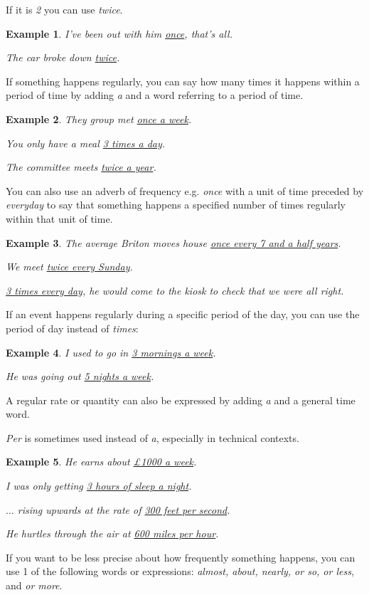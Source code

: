 \documentclass[oneside]{book}
\numberwithin{equation}{section}
\newtheorem{example}{Example}[section]
\begin{document}
If it is \textit{2} you can use \textit{twice}.
\begin{example}
    I've been out with him \underline{once}, that's all.
    
    The car broke down \underline{twice}.
\end{example}
If something happens regularly, you can say how many times it happens within a period of time by adding \textit{a} and a word referring to a period of time.
\begin{example}
    They group met \underline{once a week}.
    
    You only have a meal \underline{3 times a day}.
    
    The committee meets \underline{twice a year}.
\end{example}
You can also use an adverb of frequency e.g. \textit{once} with a unit of time preceded by \textit{everyday} to say that something happens a specified number of times regularly within that unit of time.
\begin{example}
    The average Briton moves house \underline{once every 7 and a half years}.
    
    We meet \underline{twice every Sunday}.
    
    \underline{3 times every day}, he would come to the kiosk to check that we were all right.
\end{example}
If an event happens regularly during a specific period of the day, you can use the period of day instead of \textit{times}:
\begin{example}
    I used to go in \underline{3 mornings a week}.
    
    He was going out \underline{5 nights a week}.
\end{example}
A regular rate or quantity can also be expressed by adding \textit{a} and a general time word.

\textit{Per} is sometimes used instead of \textit{a}, especially in technical contexts.
\begin{example}
    He earns about \underline{\pounds1000 a week}.
    
    I was only getting \underline{3 hours of sleep a night}.
    
    $\ldots$ rising upwards at the rate of \underline{300 feet per second}.
    
    He hurtles through the air at \underline{600 miles per hour}.
\end{example}
%
\noindent{} If you want to be less precise about how frequently something happens, you can use 1 of the following words or expressions: \textit{almost, about, nearly, or so, or less}, and \textit{or more}.
\end{document}
